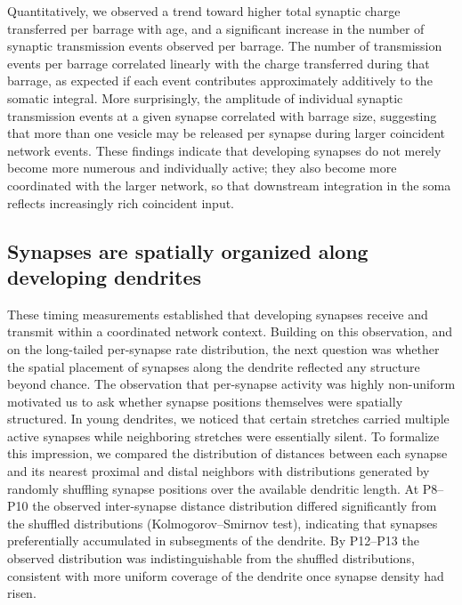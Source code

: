 \documentclass[11pt]{article}
\begin{document}
Quantitatively, we observed a trend toward higher total synaptic charge transferred per barrage with age, and a significant increase in the number of synaptic transmission events observed per barrage. The number of transmission events per barrage correlated linearly with the charge transferred during that barrage, as expected if each event contributes approximately additively to the somatic integral. More surprisingly, the amplitude of individual synaptic transmission events at a given synapse correlated with barrage size, suggesting that more than one vesicle may be released per synapse during larger coincident network events. These findings indicate that developing synapses do not merely become more numerous and individually active; they also become more coordinated with the larger network, so that downstream integration in the soma reflects increasingly rich coincident input.

\subsection{Synapses are spatially organized along developing dendrites}

These timing measurements established that developing synapses receive and transmit within a coordinated network context. Building on this observation, and on the long-tailed per-synapse rate distribution, the next question was whether the spatial placement of synapses along the dendrite reflected any structure beyond chance. The observation that per-synapse activity was highly non-uniform motivated us to ask whether synapse positions themselves were spatially structured. In young dendrites, we noticed that certain stretches carried multiple active synapses while neighboring stretches were essentially silent. To formalize this impression, we compared the distribution of distances between each synapse and its nearest proximal and distal neighbors with distributions generated by randomly shuffling synapse positions over the available dendritic length. At P8--P10 the observed inter-synapse distance distribution differed significantly from the shuffled distributions (Kolmogorov--Smirnov test), indicating that synapses preferentially accumulated in subsegments of the dendrite. By P12--P13 the observed distribution was indistinguishable from the shuffled distributions, consistent with more uniform coverage of the dendrite once synapse density had risen.
\end{document}
